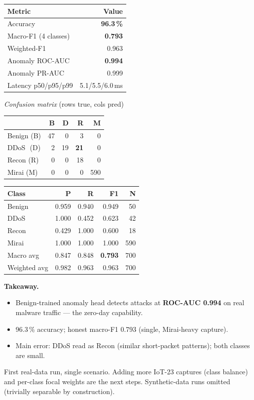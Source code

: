 \documentclass[11pt,a4paper]{article}
\newcommand{\hd}[1]{\textbf{\textcolor{accent}{#1}}}
\begin{document}
\begin{minipage}[t]{0.46\textwidth}
\centering
\small
\renewcommand{\arraystretch}{1.15}
\begin{tabular}{@{}lr@{}}
\toprule
\textbf{Metric} & \textbf{Value} \\
\midrule
Accuracy            & \textbf{96.3\,\%} \\
Macro-F1 (4 classes)& \textbf{0.793} \\
Weighted-F1         & 0.963 \\
\addlinespace
Anomaly ROC-AUC     & \textbf{0.994} \\
Anomaly PR-AUC      & 0.999 \\
\addlinespace
Latency p50/p95/p99 & 5.1/5.5/6.0\,ms \\
\bottomrule
\end{tabular}

\vspace{8pt}
{\small\textit{Confusion matrix} (rows true, cols pred)}\\[2pt]
\renewcommand{\arraystretch}{1.1}
\begin{tabular}{@{}l rrrr@{}}
\toprule
 & B & D & R & M \\
\midrule
Benign (B) & 47 & 0 & 3 & 0 \\
DDoS\ \,(D) & 2 & 19 & \textbf{21} & 0 \\
Recon (R) & 0 & 0 & 18 & 0 \\
Mirai (M) & 0 & 0 & 0 & 590 \\
\bottomrule
\end{tabular}
\end{minipage}
\hfill
\begin{minipage}[t]{0.50\textwidth}
\centering
\small
\renewcommand{\arraystretch}{1.15}
\begin{tabular}{@{}lrrrr@{}}
\toprule
\textbf{Class} & \textbf{P} & \textbf{R} & \textbf{F1} & \textbf{N} \\
\midrule
Benign & 0.959 & 0.940 & 0.949 & 50 \\
DDoS   & 1.000 & 0.452 & 0.623 & 42 \\
Recon  & 0.429 & 1.000 & 0.600 & 18 \\
Mirai  & 1.000 & 1.000 & 1.000 & 590 \\
\midrule
Macro avg    & 0.847 & 0.848 & \textbf{0.793} & 700 \\
Weighted avg & 0.982 & 0.963 & 0.963 & 700 \\
\bottomrule
\end{tabular}

\vspace{8pt}
\raggedright
{\small
\hd{Takeaway.}
\begin{itemize}[leftmargin=1.1em, itemsep=1pt, topsep=2pt]
  \item Benign-trained anomaly head detects attacks at \textbf{ROC-AUC 0.994} on real malware traffic --- the zero-day capability.
  \item 96.3\,\% accuracy; honest macro-F1 0.793 (single, Mirai-heavy capture).
  \item Main error: DDoS read as Recon (similar short-packet patterns); both classes are small.
\end{itemize}}
\end{minipage}

\vspace{4pt}
\noindent\textcolor{neutral}{\footnotesize First real-data run, single scenario. Adding more IoT-23 captures (class balance) and per-class focal weights are the next steps. Synthetic-data runs omitted (trivially separable by construction).}
\end{document}
